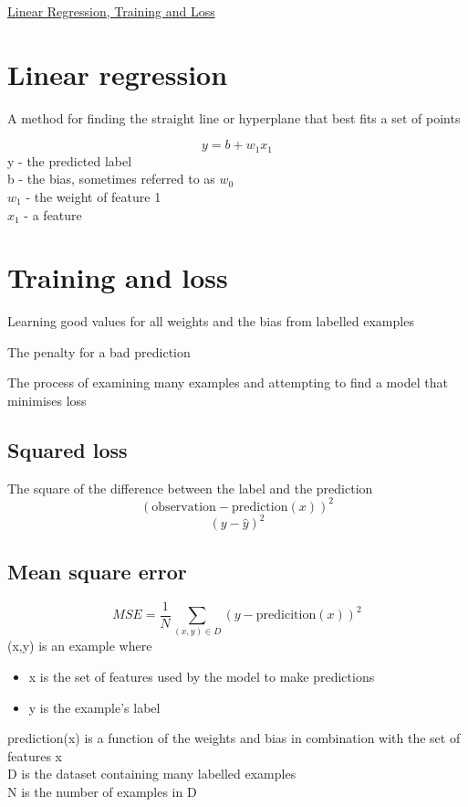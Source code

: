 \documentclass{article}[18pt]
\begin{document}
\begin{center}
\underline{\huge Linear Regression, Training and Loss}
\end{center}
\section{Linear regression}
\begin{definition}
A method for finding the straight line or hyperplane that best fits a set of points
\end{definition}
$$y=b+w_1x_1$$
y - the predicted label\\
b - the bias, sometimes referred to as $w_0$\\
$w_1$ - the weight of feature 1\\
$x_1$ - a feature
\section{Training and loss}
\begin{definition}
Learning good values for all weights and the bias from labelled examples
\end{definition}
\begin{definition}[Loss]
The penalty for a bad prediction
\end{definition}
\begin{definition}
The process of examining many examples and attempting to find a model that minimises loss
\end{definition}
\subsection{Squared loss}
The square of the difference between the label and the prediction
$$(\text{observation}-\text{prediction}(x))^2$$
$$(y-\hat{y})^2$$
\subsection{Mean square error}
$$MSE=\dfrac{1}{N}\sum_{(x,y)\in D}(y-\text{predicition}(x))^2$$
(x,y) is an example where
\begin{itemize}
	\item x is the set of features used by the model to make predictions
	\item y is the example's label
\end{itemize}
prediction(x) is a function of the weights and bias in combination with the set of features x\\
D is the dataset containing many labelled examples\\
N is the number of examples in D
\end{document}
